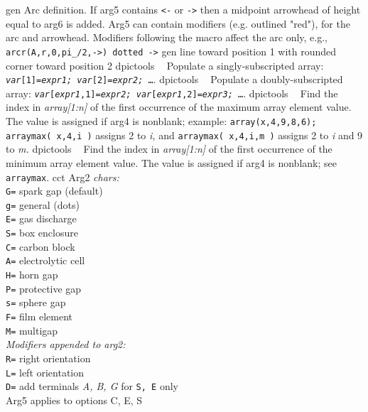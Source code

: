 %
  {gen}%
  {Arc definition.  If arg5 contains {\tt <-} or {\tt ->} then a midpoint
    arrowhead of height equal to arg6 is added. Arg5 can contain modifiers
    (e.g. outlined "red"), for the arc and arrowhead.  Modifiers following
    the macro affect the arc only,
    e.g., {\tt arcr(A,r,0,pi\_/2,->) dotted ->}%
   }%
%
  {gen}%
  {line toward position 1 with rounded corner toward position 2}%
%
  {dpictools}%
  {$\;\;$  Populate a singly-subscripted array:
    {\tt {\sl var}[1]={\sl expr1;} {\sl var}[2]={\sl expr2;} \ldots}.}%
%
  {dpictools}%
  {$\;\;$  Populate a doubly-subscripted array:
    {\tt {\sl var}[{\sl expr1},1]={\sl expr2;}
         {\sl var}[{\sl expr1},2]={\sl expr3;} \ldots}.}%
%
  {dpictools}%
  {$\;\;$ Find the index in {\sl array[1:n]} of the first occurrence
   of the maximum array element value.  The value is assigned if arg4 is
   nonblank; example: 
   {\tt array(x,4,9,8,6); arraymax( x,4,i )}
    assigns 2 to {\sl i,} and {\tt arraymax( x,4,i,m )}
    assigns 2 to {\sl i} and 9 to {\sl m.}}%
%
  {dpictools}%
  {$\;\;$ Find the index in {\sl array[1:n]} of the first occurrence
   of the minimum array element value.  The value is assigned if arg4 is
   nonblank; see {\tt arraymax}.}%
%
  {cct}%
{Arg2 {\sl chars:}\\
    {\tt G=} spark gap (default)\\
    {\tt g=} general (dots)\\
    {\tt E=} gas discharge\\
    {\tt S=} box enclosure\\
    {\tt C=} carbon block\\
    {\tt A=} electrolytic cell\\
    {\tt H=} horn gap\\
    {\tt P=} protective gap\\
    {\tt s=} sphere gap\\
    {\tt F=} film element\\
    {\tt M=} multigap\\
    {\sl Modifiers appended to arg2:}\\
    {\tt R=} right orientation\\
    {\tt L=} left orientation\\
    {\tt D=} add terminals {\sl A, B, G} for {\tt S, E} only\\
    Arg5 applies to options C, E, S
    }%
